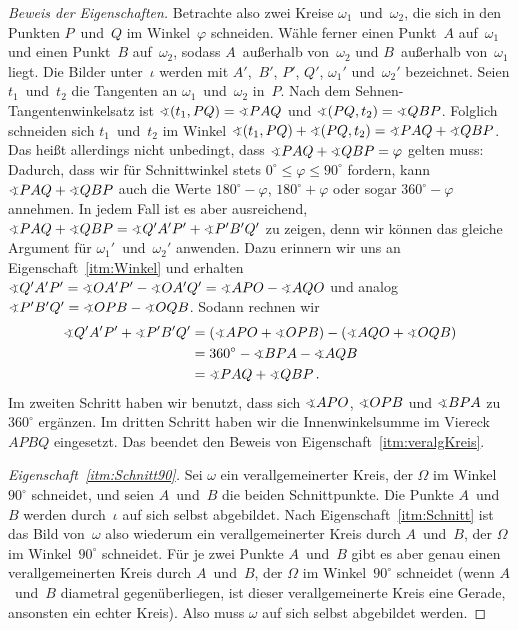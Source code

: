 \begin{proof}[Beweis der Eigenschaften]
	Betrachte also zwei Kreise $\omega_1$~und~$\omega_2$, die sich in den Punkten $P$~und~$Q$ im Winkel~$\varphi$ schneiden. Wähle ferner einen Punkt~$A$ auf~$\omega_1$ und einen Punkt~$B$ auf~$\omega_2$, sodass $A$~außerhalb von~$\omega_2$ und $B$~außerhalb von~$\omega_1$ liegt. Die Bilder unter~$\iota$ werden mit $A'$,~$B'$, $P'$, $Q'$, $\omega_1'$ und~$\omega_2'$ bezeichnet. Seien $t_1$~und~$t_2$ die Tangenten an $\omega_1$~und~$\omega_2$ in~$P$. Nach dem Sehnen-Tangentenwinkelsatz ist $\winkel (t_1,PQ)=\winkel PAQ$ und $\winkel (PQ,t_2)=\winkel QBP$. Folglich schneiden sich $t_1$~und~$t_2$ im Winkel $\winkel(t_1,PQ)+\winkel (PQ,t_2)=\winkel PAQ+\winkel QBP$. Das heißt allerdings nicht unbedingt, dass $\winkel PAQ+\winkel QBP=\varphi$ gelten muss: Dadurch, dass wir für Schnittwinkel stets $0^\circ\leqslant \varphi\leqslant 90^\circ$ fordern, kann $\winkel PAQ+\winkel QBP$ auch die Werte $180^\circ-\varphi$, $180^\circ+\varphi$ oder sogar $360^\circ-\varphi$ annehmen. In jedem Fall ist es aber ausreichend, $\winkel PAQ+\winkel QBP=\winkel Q'A'P'+\winkel P'B'Q'$ zu zeigen, denn wir können das gleiche Argument für $\omega_1'$~und~$\omega_2'$ anwenden. Dazu erinnern wir uns an Eigenschaft~\ref{itm:Winkel} und erhalten $\winkel Q'A'P'=\winkel OA'P'-\winkel OA'Q'=\winkel APO-\winkel AQO$ und analog $\winkel P'B'Q'=\winkel OPB-\winkel OQB$. Sodann rechnen wir
	\begin{align*}
		\winkel Q'A'P'+\winkel P'B'Q'&=\parens{\winkel APO+\winkel OPB}-\parens{\winkel AQO+\winkel OQB}\\
		&=360^\circ-\winkel BPA-\winkel AQB\\
		&=\winkel PAQ+\winkel QBP\,.
	\end{align*}
	Im zweiten Schritt haben wir benutzt, dass sich $\winkel APO$, $\winkel OPB$ und $\winkel BPA$ zu~$360^\circ$ ergänzen. Im dritten Schritt haben wir die Innenwinkelsumme im Viereck $APBQ$ eingesetzt. Das beendet den Beweis von Eigenschaft~\ref{itm:veralgKreis}.
	
	\emph{Eigenschaft~\ref{itm:Schnitt90}.} Sei $\omega$ ein verallgemeinerter Kreis, der $\Omega$ im Winkel~$90^\circ$ schneidet, und seien $A$~und~$B$ die beiden Schnittpunkte. Die Punkte $A$~und~$B$ werden durch~$\iota$ auf sich selbst abgebildet. Nach Eigenschaft~\ref{itm:Schnitt} ist das Bild von~$\omega$ also wiederum ein verallgemeinerter Kreis durch $A$~und~$B$, der $\Omega$ im Winkel~$90^\circ$ schneidet. Für je zwei Punkte $A$~und~$B$ gibt es aber genau einen verallgemeinerten Kreis durch $A$~und~$B$, der $\Omega$ im Winkel~$90^\circ$ schneidet (wenn $A$~und~$B$ diametral gegenüberliegen, ist dieser verallgemeinerte Kreis eine Gerade, ansonsten ein echter Kreis). Also muss $\omega$ auf sich selbst abgebildet werden.
\end{proof}

